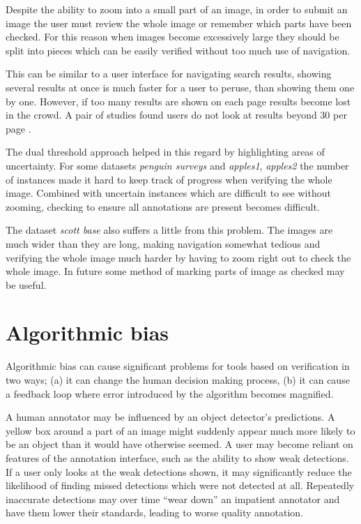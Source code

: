 Despite the ability to zoom into a small part of an image, in order to submit an image the user must review the whole image or remember which parts have been checked. For this reason when images become excessively large they should be split into pieces which can be easily verified without too much use of navigation.

This can be similar to a user interface for navigating search results, showing several results at once is much faster for a user to peruse, than showing them one by one. However, if too many results are shown on each page results become lost in the crowd. A pair of studies found users do not look at results beyond 30 per page \cite{PunchoojitLumpapun2017, Zhou2007}.

The dual threshold approach helped in this regard by highlighting areas of uncertainty. For some datasets \emph{penguin surveys} and \emph{apples1}, \emph{apples2} the number of instances made it hard to keep track of progress when verifying the whole image. Combined with uncertain instances which are difficult to see without zooming, checking to ensure all annotations are present becomes difficult.

The dataset \emph{scott base} also suffers a little from this problem. The images are much wider than they are long, making navigation somewhat tedious and verifying the whole image much harder by having to zoom right out to check the whole image. In future some method of marking parts of image as checked may be useful.

\section{Algorithmic bias}
\label{sec:machine_bias}

Algorithmic bias can cause significant problems for tools based on verification in two ways; (a) it can change the human decision making process, (b) it can cause a feedback loop where error introduced by the algorithm becomes magnified.

A human annotator may be influenced by an object detector's predictions. A yellow box around a part of an image might suddenly appear much more likely to be an object than it would have otherwise seemed. A user may become reliant on features of the annotation interface, such as the ability to show weak detections. If a user only looks at the weak detections shown, it may significantly reduce the likelihood of finding missed detections which were not detected at all. Repeatedly inaccurate detections may over time ``wear down'' an impatient annotator and have them lower their standards, leading to worse quality annotation. 


